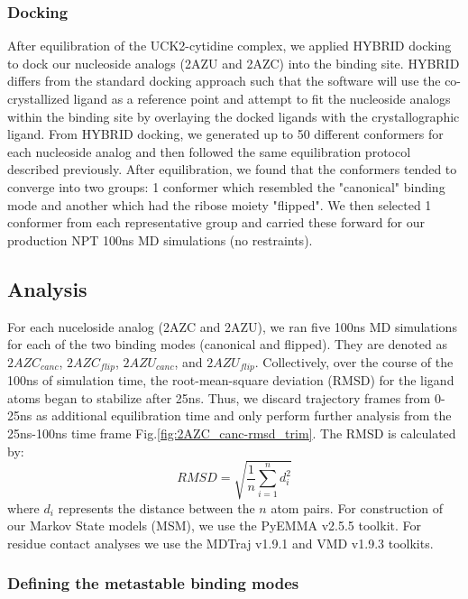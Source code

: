 \documentclass[fleqn,10pt]{wlscirep}
\begin{document}
\subsubsection{Docking}
After equilibration of the UCK2-cytidine complex, we applied HYBRID docking \cite{mcgann2012fred} to dock our nucleoside analogs (2AZU and 2AZC) into the binding site.
HYBRID differs from the standard docking approach such that the software will use the co-crystallized ligand as a reference point and attempt to fit the nucleoside analogs within the binding site by overlaying the docked ligands with the crystallographic ligand.
From HYBRID docking, we generated up to 50 different conformers for each nucleoside analog and then followed the same equilibration protocol described previously.
After equilibration, we found that the conformers tended to converge into two groups: 1 conformer which resembled the "canonical" binding mode and another which had the ribose moiety "flipped".
We then selected 1 conformer from each representative group and carried these forward for our production NPT 100ns MD simulations (no restraints).

\subsection{Analysis}
For each nuceloside analog (2AZC and 2AZU), we ran five 100ns MD simulations for each of the two binding modes (canonical and flipped).
They are denoted as $2AZC_{canc}$, $2AZC_{flip}$, $2AZU_{canc}$, and $2AZU_{flip}$.
Collectively, over the course of the 100ns of simulation time, the root-mean-square deviation (RMSD) for the ligand atoms began to stabilize after 25ns.
Thus, we discard trajectory frames from 0-25ns as additional equilibration time and only perform further analysis from the 25ns-100ns time frame Fig.\ref{fig:2AZC_canc-rmsd_trim}.
The RMSD is calculated by:
\begin{equation}
    RMSD = \sqrt{ \frac{1}{n} \sum^{n}_{i=1}{d_{i}^{2}}}
\end{equation}
where $d_{i}$ represents the distance between the $n$ atom pairs.
For construction of our Markov State models (MSM), we use the PyEMMA v2.5.5 \cite{scherer2015pyemma} toolkit.
For residue contact analyses we use the MDTraj v1.9.1 \cite{mcgibbon2015mdtraj} and VMD v1.9.3 \cite{humphrey1996vmd} toolkits.

\subsubsection{Defining the metastable binding modes}
\end{document}
